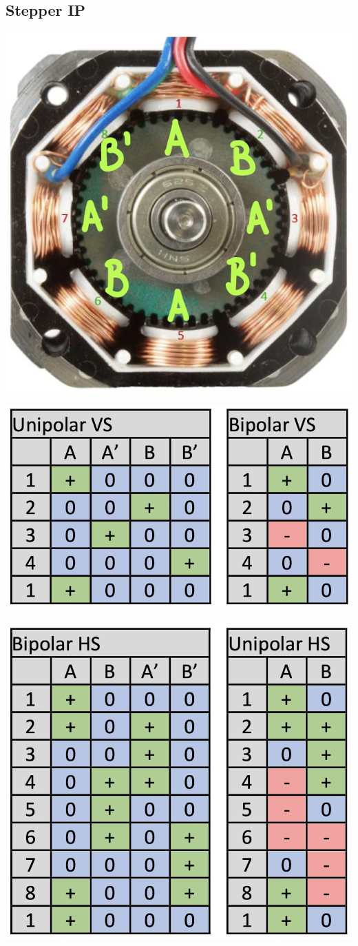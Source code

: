 \subsection{Stepper \hfill IP}
\begin{footnotesize}
    \begin{center}
        \begin{minipage}{0.4\linewidth}
            \includegraphics[width = 0.6\linewidth]{src/images/MAEIP_Stepper}
        \end{minipage}
        \begin{minipage}{0.58\linewidth}
            \includegraphics[width = 0.8\linewidth]{src/images/MAEIP_Stepper_Tab1}
        \end{minipage}
        \begin{minipage}{0.4\linewidth}
            \includegraphics[width = 0.8\linewidth]{src/images/MAEIP_Stepper_Tab2}

\end{minipage}
\end{center}
\end{footnotesize}
